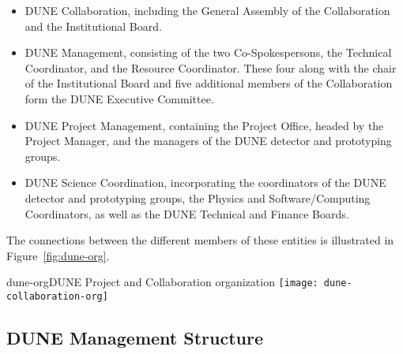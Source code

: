\begin{itemize}
\item DUNE Collaboration, including the General Assembly of the Collaboration and the Institutional Board. %
\item DUNE Management, consisting of the two Co-Spokespersons, the Technical Coordinator, and the Resource Coordinator.  These four along with the chair of the Institutional Board and five additional members of the Collaboration form the DUNE Executive Committee.
\item DUNE Project Management, containing the Project Office, headed by the Project Manager, and the managers of the DUNE detector and prototyping groups. 
\item DUNE Science Coordination, incorporating the coordinators of the DUNE detector and prototyping groups, the Physics and Software/Computing Coordinators, as well as the DUNE Technical and Finance Boards.
\end{itemize}
The connections between the different members of these entities is illustrated in Figure~\ref{fig:dune-org}.


\begin{cdrfigure}{dune-org}{DUNE Project and Collaboration organization}
  \texttt{[image: dune-collaboration-org]}
\end{cdrfigure}


\subsection{DUNE Management Structure}

